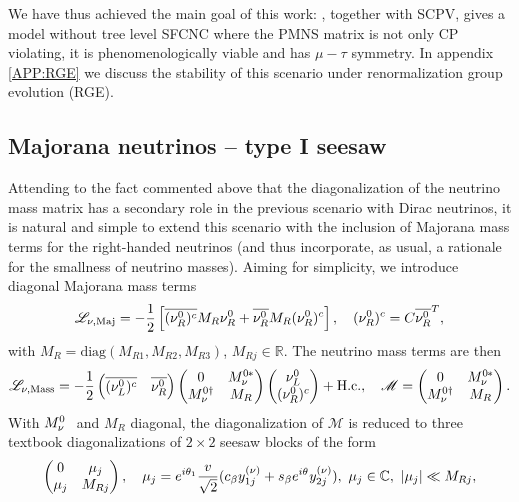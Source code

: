 \documentclass[12pt,a4paper]{article}
\begin{document}
We have thus achieved the main goal of this work: , together with SCPV, gives a model without tree level SFCNC where the PMNS matrix is not only CP violating, it is phenomenologically viable and has $\mu-\tau$ symmetry. In appendix \ref{APP:RGE} we discuss the stability of this scenario under renormalization group evolution (RGE).

\subsection{Majorana neutrinos -- type I seesaw\label{sSEC:Majorana}}
Attending to the fact commented above that the diagonalization of the neutrino mass matrix has a secondary role in the previous scenario with Dirac neutrinos, it is natural and simple to extend this scenario with the inclusion of Majorana mass terms for the right-handed neutrinos (and thus incorporate, as usual, a rationale for the smallness of neutrino masses). Aiming for simplicity, we introduce diagonal Majorana mass terms
\begin{equation}\label{eq:MajoranaMassTerm:00}
 \mathscr L_{\rm \nu,Maj}=-\frac{1}{2}\left[\overline{(\nu_R^0)^c} M_R \nu_R^0+\overline{\nu_R^0}M_R(\nu_R^0)^c\right],\quad (\nu_R^0)^c=C\overline{\nu_R^0}^T,
\end{equation}
with $M_R=\text{diag}(M_{R1},M_{R2},M_{R3})$, $M_{Rj}\in\mathbb{R}$.
The neutrino mass terms are then
\begin{equation}\label{eq:MajoranaMassTerm:01}
 \mathscr L_{\rm \nu,Mass}= -\frac{1}{2}\begin{pmatrix}\overline{(\wNuL)^c} & \overline{\wNR}\end{pmatrix}\begin{pmatrix} 0 & \wMNc\\ \wMNd & M_R\end{pmatrix}\begin{pmatrix}\wNuL\\ (\wNR)^c\end{pmatrix} + \Hc,\quad \mathscr M=\begin{pmatrix} 0 & \wMNc\\ \wMNd & M_R\end{pmatrix}.
\end{equation}
With $\wMN$ and $M_R$ diagonal, the diagonalization of $\mathscr M$ is reduced to three textbook diagonalizations of $2\times 2$ seesaw blocks of the form
\begin{equation}
 \begin{pmatrix} 0 & \mu_j\\ \mu_j & M_{Rj}\end{pmatrix},\quad \mu_j = e^{i\theta_{1}}\frac{v_{}}{\sqrt 2}(c_\beta y_{1j}^{\rm (\nu)}+s_\beta e^{i\theta_{}}y_{2j}^{\rm (\nu)}),\ \mu_j\in\mathbb{C},\ |\mu_j|\ll M_{Rj},
\end{equation}
\end{document}
